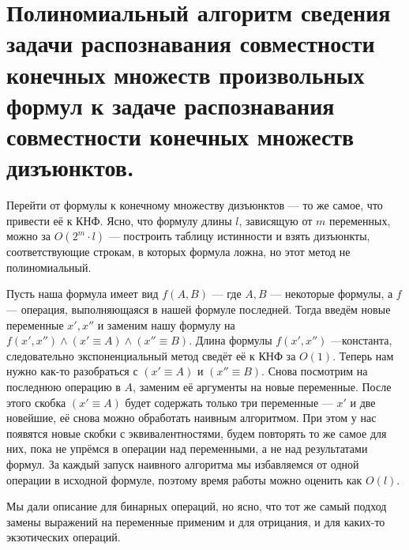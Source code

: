 \documentclass{article}
\begin{document}
\section{Полиномиальный алгоритм сведения задачи распознавания совместности конечных множеств произвольных формул к задаче распознавания совместности конечных множеств дизъюнктов.}
Перейти от формулы к конечному множеству дизъюнктов --- то же самое, что привести её к КНФ. Ясно, что формулу длины $l$, зависящую от $m$ переменных, можно за $O(2^m \cdot l)$ --- построить таблицу истинности и взять дизъюнкты, соответствующие строкам, в которых формула ложна, но этот метод не полиномиальный.

Пусть наша формула имеет вид $f(A, B)$ --- где $A, B$ --- некоторые формулы, а $f$ --- операция, выполняющаяся в нашей формуле последней. Тогда введём новые переменные $x', x''$ и заменим нашу формулу на $f(x', x'') \land (x' \equiv A) \land (x'' \equiv B)$. Длина формулы $f(x', x'')$ ---константа, следовательно экспоненциальный метод сведёт её к КНФ за $O(1)$. Теперь нам нужно как-то разобраться с $(x' \equiv A)$ и $(x'' \equiv B)$. Снова посмотрим на последнюю операцию в $A$, заменим её аргументы на новые переменные. После этого скобка $(x' \equiv A)$ будет содержать только три переменные --- $x'$ и две новейшие, её снова можно обработать наивным алгоритмом. При этом у нас появятся новые скобки с эквивалентностями, будем повторять то же самое для них, пока не упрёмся в операции над переменными, а не над результатами формул. За каждый запуск наивного алгоритма мы избавляемся от одной операции в исходной формуле, поэтому время работы можно оценить как $O(l)$.

Мы дали описание для бинарных операций, но ясно, что тот же самый подход замены выражений на переменные применим и для отрицания, и для каких-то экзотических операций.
\end{document}
